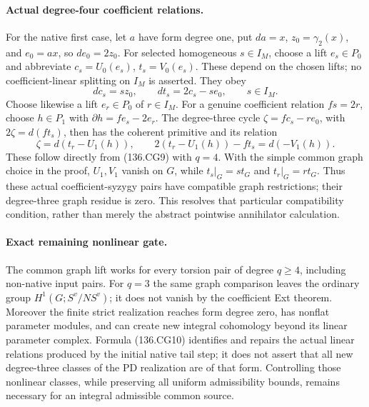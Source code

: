 \paragraph{Actual degree-four coefficient relations.}
For the native first case, let \(a\) have form degree one,
put \(da=x\), \(z_0=\gamma_2(x)\), and \(e_0=ax\),
so \(de_0=2z_0\). For selected homogeneous \(s\in I_M\),
choose a lift \(e_s\in P_0\) and abbreviate
\(c_s=U_0(e_s)\), \(t_s=V_0(e_s)\). These depend on the
chosen lifts; no coefficient-linear splitting on \(I_M\)
is asserted. They obey
\[
 dc_s=s z_0,\qquad dt_s=2c_s-s e_0,
                 \qquad s\in I_M.
\]
Choose likewise a lift \(e_r\in P_0\) of \(r\in I_M\).
For a genuine coefficient relation \(fs=2r\), choose
\(h\in P_1\) with \(\partial h=f e_s-2e_r\).
The degree-three cycle
\(\zeta=f c_s-r e_0\), with \(2\zeta=d(f t_s)\), then
has the coherent primitive and its relation
\[
 \zeta=d(t_r-U_1(h)),\qquad
 2(t_r-U_1(h))-f t_s=d(-V_1(h)).                         \tag{136.CG10}
\]
These follow directly from (136.CG9) with \(q=4\).
With the simple common graph choice in the proof,
\(U_1,V_1\) vanish on \(G\), while
\(t_s|_G=s t_G\) and \(t_r|_G=r t_G\).
Thus these actual coefficient-syzygy pairs have compatible
graph restrictions; their degree-three graph residue is zero.
This resolves that particular compatibility condition, rather
than merely the abstract pointwise annihilator calculation.

\paragraph{Exact remaining nonlinear gate.}
The common graph lift works for every torsion pair of degree
\(q\geq4\), including non-native input pairs. For \(q=3\)
the same graph comparison leaves the ordinary group
\(H^1(G;S^v/NS^v)\); it does not vanish by the coefficient
Ext theorem. Moreover the finite strict realization reaches
form degree zero, has nonflat parameter modules, and can
create new integral cohomology beyond its linear parameter
complex. Formula (136.CG10) identifies and repairs the actual
linear relations produced by the initial native tail step;
it does not assert that all new degree-three classes of the
PD realization are of that form. Controlling those nonlinear
classes, while preserving all uniform admissibility bounds,
remains necessary for an integral admissible common source.
